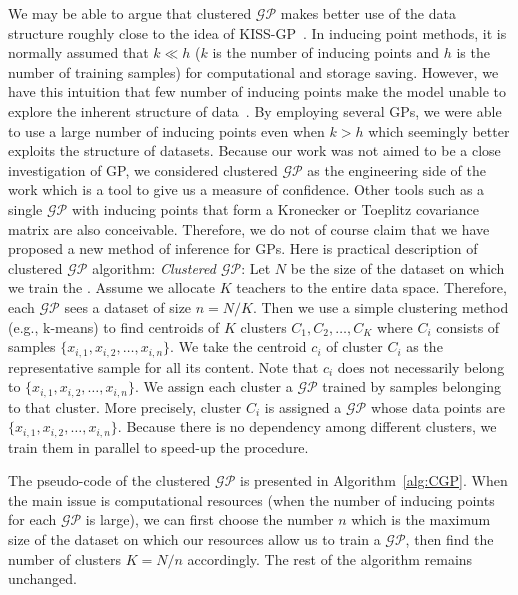 We may be able to argue that clustered $\mathcal{GP}$ makes better use of the data structure roughly close to the idea of KISS-GP~\citep{Wilson:2015:KIS:3045118.3045307}.
In inducing point methods, it is normally assumed that $k \ll h$ ($k$ is the number of inducing points and $h$ is the number of training samples) for computational and storage saving. However, we have this intuition that few number of inducing points make the model unable to explore the inherent structure of data~\citep{Wilson:2015:KIS:3045118.3045307}. By employing several GPs, we were able to use a large number of inducing points even when $k>h$ which seemingly better exploits the structure of datasets. Because our work was not aimed to be a close investigation of GP, we considered clustered $\mathcal{GP}$ as the engineering side of the work which is a tool to give us a measure of confidence. Other tools such as a single $\mathcal{GP}$ with inducing points that form a Kronecker or Toeplitz covariance matrix are also conceivable. Therefore, we do not of course claim that we have proposed a new method of inference for GPs.  Here is practical description of clustered $\mathcal{GP}$ algorithm:
{\it Clustered $\mathcal{GP}$}: Let $N$ be the size of the dataset on which we train the \tch. Assume we allocate $K$ teachers to the entire data space. Therefore, each $\mathcal{GP}$ sees a dataset of size $n=N/K$.
Then we use a simple clustering method (e.g., k-means) to find centroids of $K$ clusters $C_1, C_2, \ldots, C_K$ where $C_i$ consists of samples $\{x_{i,1}, x_{i,2},\ldots,x_{i,n}\}$. We take the centroid $c_i$ of cluster $C_i$ as the representative sample for all its content. Note that $c_i$ does not necessarily belong to $\{x_{i,1}, x_{i,2},\ldots,x_{i,n}\}$. We assign each cluster a $\mathcal{GP}$ trained by samples belonging to that cluster. More precisely, cluster $C_i$ is assigned a $\mathcal{GP}$ whose data points are $\{x_{i,1}, x_{i,2},\ldots,x_{i,n}\}$.
Because there is no dependency among different clusters, we train them in parallel to speed-up the procedure. 

The pseudo-code of the clustered $\mathcal{GP}$ is presented in Algorithm~\ref{alg:CGP}. When the main issue is computational resources (when the number of inducing points for each $\mathcal{GP}$ is large), we can first choose the number $n$ which is the maximum size of the dataset on which our resources allow us to train a $\mathcal{GP}$, then find the number of clusters $K=N/n$ accordingly. The rest of the algorithm remains unchanged. 



